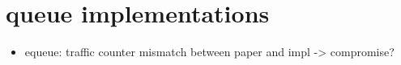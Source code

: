 \section{queue implementations}
\begin{itemize}
    \item equeue: traffic counter mismatch between paper and impl -> compromise?
\end{itemize}


